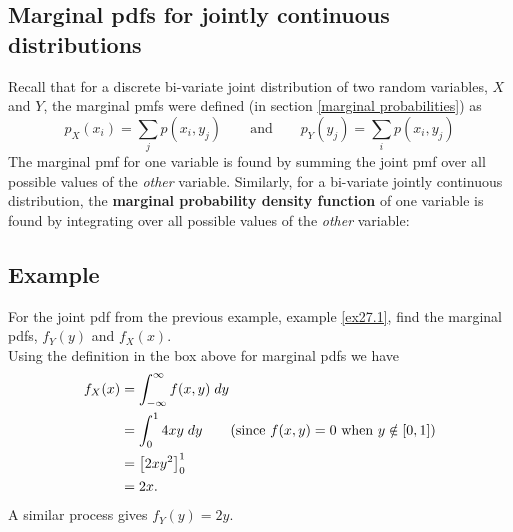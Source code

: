 \subsection{Marginal pdfs for jointly continuous distributions} \label{marginal probability density function 2} \label{f_X(x) symbol}
Recall that for a discrete bi-variate joint distribution of two random variables, $X$ and $Y$, the marginal pmfs were defined (in section \ref{marginal probabilities}) as 
\[
p_X(x_i) = \sum_j p(x_i,y_j) \qquad \text{and} \qquad p_Y(y_j) = \sum_i p(x_i,y_j)
\]
The marginal pmf for one variable is found by summing the joint pmf over all possible values of the \textit{other} variable. Similarly, for a bi-variate jointly continuous distribution, the \textbf{marginal probability density function} of one variable is found by integrating over all possible values of the \textit{other} variable:
  
  	\bigskip
	
	\hfil{}
	\bigskip
	\bigskip
	
\subsection{Example} \label{ex27.3}
For the joint pdf from the previous example, example \ref{ex27.1}, find the marginal pdfs, $f_Y(y)$ and $f_X(x)$. \\

\solution
Using the definition in the box above for marginal pdfs we have
\begin{align*}
f_X(x) & = \int_{-\infty}^\infty f(x,y) \; dy \\
	& = \int_0^1 4xy \; dy \tag{since $f(x,y) = 0$ when $y \notin [0,1]$} \\
	& = \left[2xy^2\right]_0^1 \\
	& = 2x.
\end{align*}
A similar process gives $f_Y(y) = 2y$.

